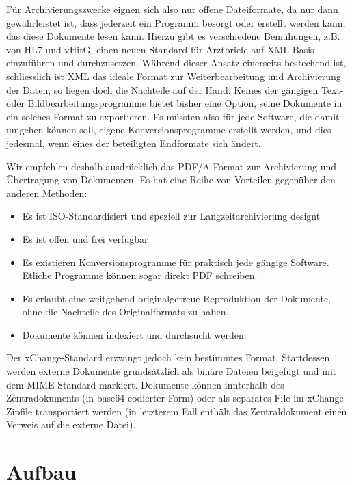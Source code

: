 \documentclass[a4paper]{scrartcl}
\begin{document}
Für Archivierungszwecke eignen sich also nur offene Dateiformate, da nur dann gewährleistet ist, dass jederzeit ein Programm besorgt oder erstellt werden kann, das diese Dokumente lesen kann.
Hierzu gibt es verschiedene Bemühungen, z.B. von HL7 und vHitG, einen neuen Standard für Arztbriefe auf XML-Basis einzuführen und durchzusetzen. Während dieser Ansatz einerseits bestechend ist, schliesslich ist XML das ideale Format zur Weiterbearbeitung und Archivierung der Daten, so liegen doch die Nachteile auf der Hand: Keines der gängigen Text- oder Bildbearbeitungsprogramme bietet bisher eine Option, seine Dokumente in ein solches Format zu exportieren. Es müssten also für jede Software, die damit umgehen können soll, eigene Konversionsprogramme erstellt werden, und dies jedesmal, wenn eines der beteiligten Endformate sich ändert.

Wir empfehlen deshalb ausdrücklich das PDF/A Format zur Archivierung und Übertragung von Dokumenten. Es hat eine Reihe von Vorteilen gegenüber den anderen Methoden:
\begin{itemize}
\item Es ist ISO-Standardisiert und speziell zur Langzeitarchivierung designt
\item Es ist offen und frei verfügbar
\item Es existieren Konversionsprogramme für praktisch jede gängige Software. Etliche Programme können sogar direkt PDF schreiben.
\item Es erlaubt eine weitgehend originalgetreue Reproduktion der Dokumente, ohne die Nachteile des Originalformats zu haben.
\item Dokumente können indexiert und durchsucht werden.
\end{itemize}

Der xChange-Standard erzwingt jedoch kein bestimmtes Format. Stattdessen werden externe Dokumente grundsätzlich als binäre Dateien beigefügt und mit dem MIME-Standard markiert. Dokumente können innterhalb des Zentradokuments (in base64-codierter Form) oder als separates File im xChange-Zipfile transportiert werden (in letzterem Fall enthält das Zentraldokument einen Verweis auf die externe Datei).

\part{Aufbau}
\end{document}
